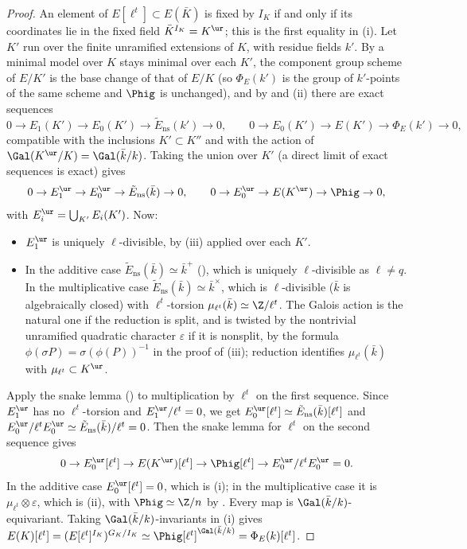 \begin{proof}
An element of $E[\ell^t]\subset E(\bar K)$ is fixed by $I_K$ if and only if its coordinates lie in the fixed field
$\bar K^{I_K}=K^{\ur}$; this is the first equality in (i). Let $K'$ run over the finite unramified extensions of $K$,
with residue fields $k'$. By  a minimal model over $K$ stays minimal over
each $K'$, the component group scheme of $E/K'$ is the base change of that of $E/K$ (so $\Phi_E(k')$ is the group of
$k'$-points of the same scheme and $\Phig$ is unchanged), and by  and
(ii) there are exact sequences
\[
0\to E_1(K')\to E_0(K')\to\tilde E_{\mathrm{ns}}(k')\to0,\qquad 0\to E_0(K')\to E(K')\to\Phi_E(k')\to0,
\]
compatible with the inclusions $K'\subset K''$ and with the action of $\Gal(K^{\ur}/K)=\Gal(\bar k/k)$. Taking the union
over $K'$ (a direct limit of exact sequences is exact) gives
\[
0\to E_1^{\ur}\to E_0^{\ur}\to\tilde E_{\mathrm{ns}}(\bar k)\to0,\qquad 0\to E_0^{\ur}\to E(K^{\ur})\to\Phig\to0,
\]
with $E_i^{\ur}=\bigcup_{K'}E_i(K')$. Now:
\begin{itemize}
\item $E_1^{\ur}$ is uniquely $\ell$-divisible, by (iii) applied over each $K'$.
\item In the additive case $\tilde E_{\mathrm{ns}}(\bar k)\simeq\bar k^+$ (), which is uniquely
$\ell$-divisible as $\ell\ne q$. In the multiplicative case $\tilde E_{\mathrm{ns}}(\bar k)\simeq\bar k^\times$, which is
$\ell$-divisible ($\bar k$ is algebraically closed) with $\ell^t$-torsion $\mu_{\ell^t}(\bar k)\simeq\Z/\ell^t$. The
Galois action is the natural one if the reduction is split, and is twisted by the nontrivial unramified quadratic
character $\varepsilon$ if it is nonsplit, by the formula $\phi(\sigma P)=\sigma(\phi(P))^{-1}$ in the proof of
(iii); reduction identifies $\mu_{\ell^t}(\bar k)$ with $\mu_{\ell^t}\subset K^{\ur}$.
\end{itemize}
Apply the snake lemma () to multiplication by $\ell^t$ on the first sequence. Since $E_1^{\ur}$ has
no $\ell^t$-torsion and $E_1^{\ur}/\ell^t=0$, we get $E_0^{\ur}[\ell^t]\simeq\tilde E_{\mathrm{ns}}(\bar k)[\ell^t]$ and
$E_0^{\ur}/\ell^tE_0^{\ur}\simeq\tilde E_{\mathrm{ns}}(\bar k)/\ell^t=0$. Then the snake lemma for $\ell^t$ on the second
sequence gives
\[
0\to E_0^{\ur}[\ell^t]\to E(K^{\ur})[\ell^t]\to\Phig[\ell^t]\to E_0^{\ur}/\ell^tE_0^{\ur}=0 .
\]
In the additive case $E_0^{\ur}[\ell^t]=0$, which is (i); in the multiplicative case it is $\mu_{\ell^t}\otimes\varepsilon$,
which is (ii), with $\Phig\simeq\Z/n$ by . Every map is
$\Gal(\bar k/k)$-equivariant. Taking $\Gal(\bar k/k)$-invariants in (i) gives
$E(K)[\ell^t]=(E[\ell^t]^{I_K})^{G_K/I_K}\simeq\Phig[\ell^t]^{\Gal(\bar k/k)}=\Phi_E(k)[\ell^t]$.


\end{proof}
